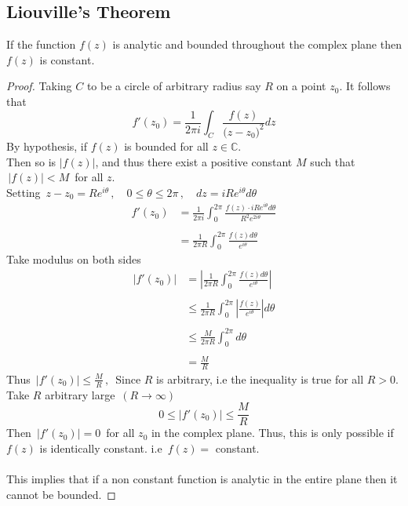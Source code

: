 \documentclass[11pt,a4paper]{article}
\theoremstyle{definition}
\begin{document}
{\color[wave]{485}\subsection{Liouville's Theorem}}
If the function $f(z)$ is analytic and bounded throughout the complex plane then $f(z)$ is constant.\\


\begin{proof}
Taking $C$ to be a circle of arbitrary radius say $R$ on a point $z_0$. It follows that $$f'(z_0) = \frac{1}{2\pi i}\int_C \frac{f(z)}{\big(z - z_0\big)^2}dz$$
By hypothesis, if $f(z)$ is bounded for all $z\in \mathbb{C}$.\\
Then so is $\left|f(z)\right|$, and thus there exist a positive constant $M$ such that $\,\left|f(z)\right|< M\,$ for all $z$.\\

Setting $\, z - z_0 = Re^{i\theta}\,,\quad  0\leq \theta \leq 2\pi\,, \quad  dz = iRe^{i\theta}d\theta$
\begin{align*}
f'(z_0) & = \frac{1}{2\pi i}\int^{2\pi}_0 \frac{f(z)\cdot iRe^{i\theta} d\theta}{R^2e^{2i\theta}}\\\\
& = \frac{1}{2\pi R}\int^{2\pi}_0\frac{f(z)d\theta}{e^{i\theta}}
\end{align*}
Take modulus on both sides
\begin{align*}
\left|f'(z_0)\right| & = \left|\frac{1}{2\pi R}\displaystyle{\int^{2\pi}_0}\frac{f(z)d\theta}{e^{i\theta}}\right|\\\\
& \leq \frac{1}{2\pi R}\int^{2\pi}_0\left|\frac{f(z)}{e^{i\theta}}\right|d\theta\\\\
& \leq \frac{M}{2\pi R}\int^{2\pi}_0 d\theta\\\\
& = \frac{M}{R}
\end{align*}
Thus $\,\left|f'(z_0)\right|\leq \frac{M}{R}\,,\,$ Since $R$ is arbitrary, i.e the inequality is true for all $R>0$.\\

Take $R$ arbitrary large $\, ( R\longrightarrow \infty)$
$$0 \leq \left|f'(z_0)\right| \leq \frac{M}{R}$$
Then $\,\left|f'(z_0)\right| =0 \,$ for all $z_0$ in the complex plane. Thus, this is only possible if $f(z)$ is identically constant. i.e $\, f(z) = $ constant.\\\\



This implies that if a non constant function is analytic in the entire plane then it cannot be bounded.
\end{proof}
\end{document}
